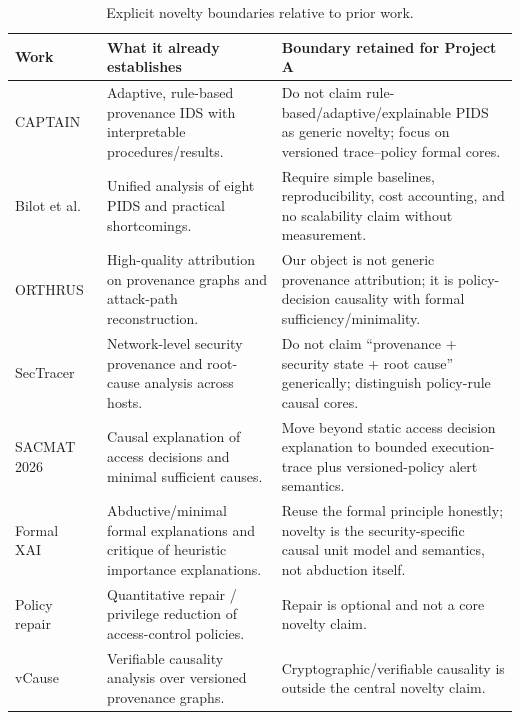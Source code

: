 \documentclass[11pt]{article}
\theoremstyle{remark}
\begin{document}
\begin{table}[h]
\centering
\small
\begin{tabularx}{\textwidth}{p{2.5cm}p{4cm}X}
\toprule
Work & What it already establishes & Boundary retained for Project A \\
\midrule
CAPTAIN~\citep{Wang2025_r57} & Adaptive, rule-based provenance IDS with interpretable procedures/results. & Do not claim rule-based/adaptive/explainable PIDS as generic novelty; focus on versioned trace--policy formal cores.\\
Bilot et al.~\citep{Bilot2025_r55} & Unified analysis of eight PIDS and practical shortcomings. & Require simple baselines, reproducibility, cost accounting, and no scalability claim without measurement.\\
ORTHRUS~\citep{Jiang2025_r54} & High-quality attribution on provenance graphs and attack-path reconstruction. & Our object is not generic provenance attribution; it is policy-decision causality with formal sufficiency/minimality.\\
SecTracer~\citep{Lee2026_r58} & Network-level security provenance and root-cause analysis across hosts. & Do not claim ``provenance + security state + root cause'' generically; distinguish policy-rule causal cores.\\
SACMAT 2026~\citep{HaselMehri2026Causal} & Causal explanation of access decisions and minimal sufficient causes. & Move beyond static access decision explanation to bounded execution-trace plus versioned-policy alert semantics.\\
Formal XAI~\citep{Ignatiev2019_r29,MarquesSilvaHuang2024} & Abductive/minimal formal explanations and critique of heuristic importance explanations. & Reuse the formal principle honestly; novelty is the security-specific causal unit model and semantics, not abduction itself.\\
Policy repair~\citep{Eiers2023Repair,DAntoni2024Privilege} & Quantitative repair / privilege reduction of access-control policies. & Repair is optional and not a core novelty claim.\\
vCause~\citep{Song2026VCause} & Verifiable causality analysis over versioned provenance graphs. & Cryptographic/verifiable causality is outside the central novelty claim.\\
\bottomrule
\end{tabularx}
\caption{Explicit novelty boundaries relative to prior work.}\label{tab:positioning}
\end{table}
\end{document}
